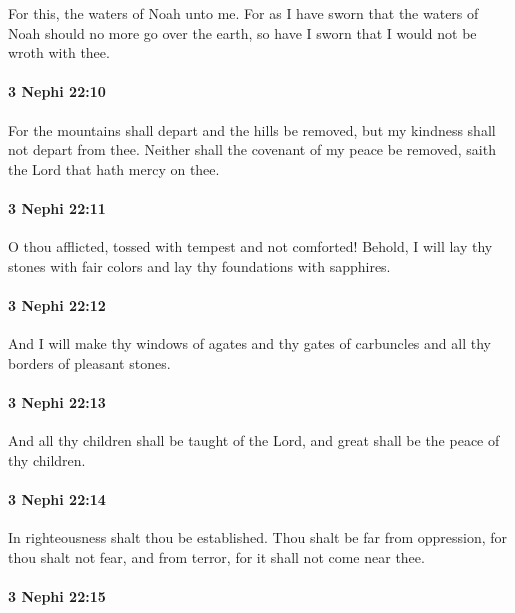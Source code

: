 			For this, the waters of Noah unto me.
			For as I have sworn that the waters of Noah should no more go over the earth,
			so have I sworn that I would not be wroth with thee.

		\paragraph{3 Nephi 22:10} %
			\label{3NEPHI-22-10}

			For the mountains shall depart and the hills be removed,
			but my kindness shall not depart from thee.
			Neither shall the covenant of my peace be removed,
			saith the Lord that hath mercy on thee.

		\paragraph{3 Nephi 22:11} %
			\label{3NEPHI-22-11}

			O thou afflicted, tossed with tempest and not comforted!
			Behold, I will lay thy stones with fair colors
			and lay thy foundations with sapphires.

		\paragraph{3 Nephi 22:12} %
			\label{3NEPHI-22-12}

			And I will make thy windows of agates
			and thy gates of carbuncles
			and all thy borders of pleasant stones.

		\paragraph{3 Nephi 22:13} %
			\label{3NEPHI-22-13}

			And all thy children shall be taught of the Lord,
			and great shall be the peace of thy children.

		\paragraph{3 Nephi 22:14} %
			\label{3NEPHI-22-14}

			In righteousness shalt thou be established.
			Thou shalt be far from oppression, for thou shalt not fear,
			and from terror, for it shall not come near thee.

		\paragraph{3 Nephi 22:15} %
			\label{3NEPHI-22-15}

